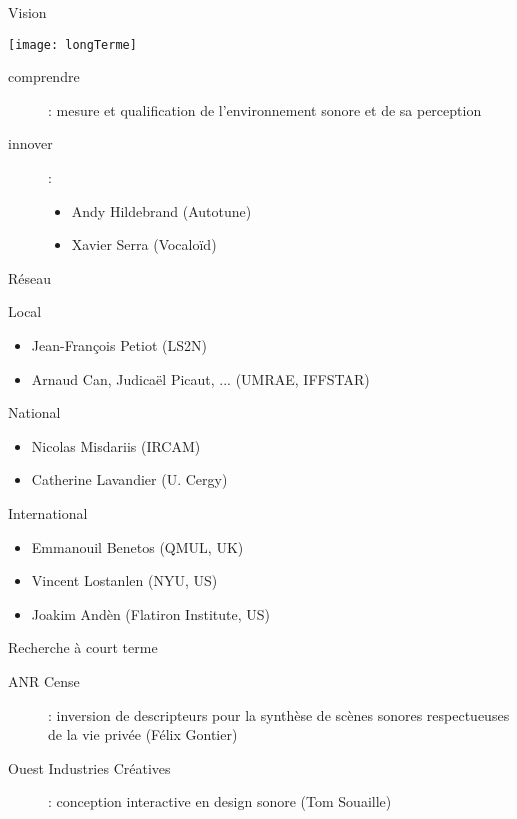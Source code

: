 \begin{frame}{Vision}
\begin{center}
 \texttt{[image: longTerme]}
\end{center}
\begin{description}
\item[comprendre] : mesure et qualification de l'environnement sonore et de sa perception
\item[innover] :
\begin{itemize}
\item Andy Hildebrand (Autotune)
\item Xavier Serra (Vocaloïd)
\end{itemize}
\end{description}
\end{frame}

\begin{frame}{Réseau}
\begin{block}{Local}
\begin{itemize}
\item Jean-François Petiot (LS2N)
\item Arnaud Can, Judicaël Picaut, ... (UMRAE, IFFSTAR)
\end{itemize}
\end{block}
\begin{block}{National}
\begin{itemize}
\item Nicolas Misdariis (IRCAM)
\item Catherine Lavandier (U. Cergy)
\end{itemize}
\end{block}
\begin{block}{International}
\begin{itemize}
\item Emmanouil Benetos (QMUL, UK)
\item Vincent Lostanlen (NYU, US)
\item Joakim Andèn (Flatiron Institute, US)
\end{itemize}
\end{block}
\end{frame}

\begin{frame}{Recherche à court terme}
\begin{description}
\item[ANR Cense]: inversion de descripteurs pour la synthèse de scènes sonores respectueuses de la vie privée (Félix Gontier)
\item[Ouest Industries Créatives]: conception interactive en design sonore (Tom Souaille)
\end{description}
\end{frame}

